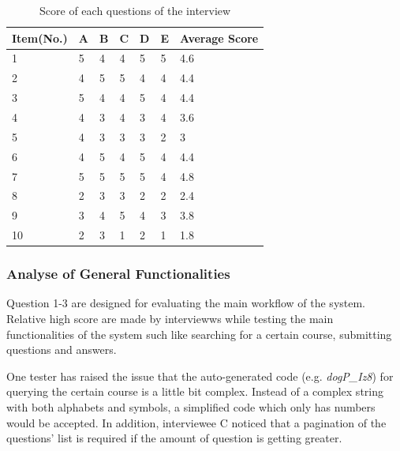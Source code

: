 \begin{table}[!htbp]
\centering
\begin{tabularx}{\textwidth}{@{}lXXXXXl@{}}
\toprule
Item(No.)       & A  & B  & C  & D  & E          & Average Score        \\ \midrule
1               & 5  & 4  & 4  & 5  & 5          & 4.6                     \\
2               & 4  & 5  & 5  & 4  & 4          & 4.4                     \\
3               & 5  & 4  & 4  & 5  & 4          & 4.4                     \\
4               & 4  & 3  & 4  & 3  & 4          & 3.6                    \\
5               & 4  & 3  & 3  & 3  & 2          & 3                     \\
6               & 4  & 5  & 4  & 5  & 4          & 4.4                     \\
7               & 5  & 5  & 5  & 5  & 4          & 4.8                     \\
8               & 2  & 3  & 3  & 2  & 2          & 2.4                     \\
9               & 3  & 4  & 5  & 4  & 3          & 3.8                     \\
10               & 2  & 3  & 1  & 2  & 1          & 1.8                     \\ \bottomrule    
\end{tabularx}
\caption{Score of each questions of the interview}
\label{table:score-interview}
\end{table}

\subsubsection{Analyse of General Functionalities}
Question 1-3 are designed for evaluating the main workflow of the system. Relative high score are made by interviewws while testing the main functionalities of the system such like searching for a certain course, submitting questions and answers.

One tester has raised the issue that the auto-generated code (e.g. \textit{dogP\_Iz8}) for querying the certain course is a little bit complex. Instead of a complex string with both alphabets and symbols, a simplified code which only has numbers would be accepted. In addition, interviewee C noticed that a pagination of the questions' list is required if the amount of question is getting greater.


